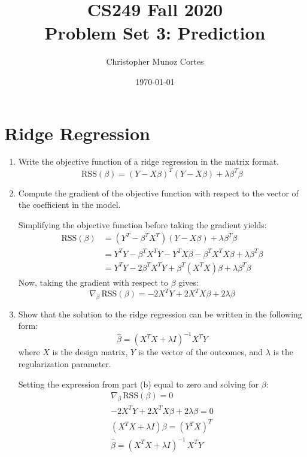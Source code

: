 \documentclass{article}
\title{CS249 Fall 2020\\
       Problem Set 3: Prediction}
\author{Christopher Munoz Cortes}
\date{\today}
\begin{document}
\maketitle

\section{Ridge Regression}

\begin{enumerate}[label={(\alph*)}]
    \item Write the objective function of a ridge regression in the matrix format.
    \[
        \text{RSS}(\beta) = (Y - X\beta)^T (Y - X\beta) + \lambda \beta^T \beta
    \]
    \item Compute the gradient of the objective function with respect to the vector of
    the coefficient in the model.
    
    Simplifying the objective function before taking the gradient yields:
    \begin{align*}
        \text{RSS}(\beta) &= (Y^T - \beta^T X^T) (Y - X\beta) + \lambda \beta^T \beta\\
        &= Y^T Y - \beta^T X^T Y - Y^T X\beta - \beta^T X^T X \beta + 
           \lambda \beta^T \beta\\
        &= Y^T Y -2\beta^TX^TY + \beta^T(X^TX)\beta + \lambda\beta^T\beta
    \end{align*}
    Now, taking the gradient with respect to $\beta$ gives:
    \[
        \nabla_\beta\,\text{RSS}(\beta) = -2X^TY + 2X^TX\beta + 2\lambda\beta
    \]
    \item Show that the solution to the ridge regression can be written in the following
    form:
    \[
        \hat{\beta} = (X^T X + \lambda I)^{-1} X^T Y
    \]
    where $X$ is the design matrix, $Y$ is the vector of the outcomes, and $\lambda$ is
    the regularization parameter.
    
    Setting the expression from part (b) equal to zero and solving for $\beta$:
    \begin{gather*}
        \nabla_\beta\,\text{RSS}(\beta) = 0\\
        -2X^TY + 2X^TX\beta + 2\lambda\beta = 0\\
        (X^TX + \lambda I) \beta = (Y^TX)^T\\
        \boxed{\hat{\beta}= (X^TX + \lambda I)^{-1}\, X^TY} \\
    \end{gather*}
\end{enumerate}
\pagebreak
\end{document}
